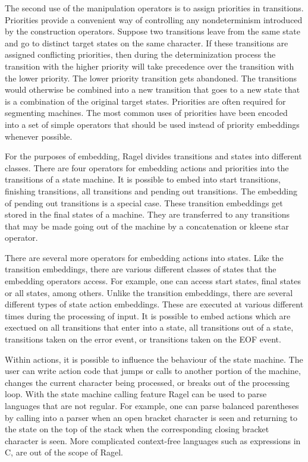 \documentclass[letterpaper,11pt,oneside]{book}
\begin{document}
The second use of the manipulation operators is to assign priorities in
transitions. Priorities provide a convenient way of controlling any
nondeterminism introduced by the construction operators. Suppose two
transitions leave from the same state and go to distinct target states on the
same character. If these transitions are assigned conflicting priorities, then
during the determinization process the transition with the higher priority will
take precedence over the transition with the lower priority. The lower priority
transition gets abandoned. The transitions would otherwise be combined into a new
transition that goes to a new state that is a combination of the original
target states. Priorities are often required for segmenting machines. The most
common uses of priorities have been encoded into a set of simple operators
that should be used instead of priority embeddings whenever possible.

For the purposes of embedding, Ragel divides transitions and states into
different classes. There are four operators for embedding actions and
priorities into the transitions of a state machine. It is possible to embed
into start transitions, finishing transitions, all transitions and pending out
transitions.  The embedding of pending out transitions is a special case.
These transition embeddings get stored in the final states of a machine.  They
are transferred to any transitions that may be made going out of the machine by
a concatenation or kleene star operator.

There are several more operators for embedding actions into states. Like the
transition embeddings, there are various different classes of states that the
embedding operators access. For example, one can access start states, final
states or all states, among others. Unlike the transition embeddings, there are
several different types of state action embeddings. These are executed at
various different times during the processing of input. It is possible to embed
actions which are exectued on all transitions that enter into a state, all
transitions out of a state, transitions taken on the error event, or
transitions taken on the EOF event.

Within actions, it is possible to influence the behaviour of the state machine.
The user can write action code that jumps or calls to another portion of the
machine, changes the current character being processed, or breaks out of the
processing loop. With the state machine calling feature Ragel can be used to
parse languages that are not regular. For example, one can parse balanced
parentheses by calling into a parser when an open bracket character is seen and
returning to the state on the top of the stack when the corresponding closing
bracket character is seen. More complicated context-free languages such as
expressions in C, are out of the scope of Ragel. 
\end{document}
